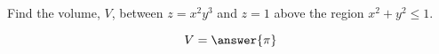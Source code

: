 \documentclass{ximera}
\author{David Guichard \and Neal Koblitz \and H. Jerome Keisler \and Albert Scheller \and Barry Balof \and Mike Wills \and Matthew Carr}
\begin{document}
\begin{exercise}





Find the volume, $V$, between $z=x^2 y^3$ and $z=1$ above the region $x^2+y^2\le 1$.

\begin{prompt}
\[
V=\answer{\pi}
\]
\end{prompt}



\end{exercise}
\end{document}
